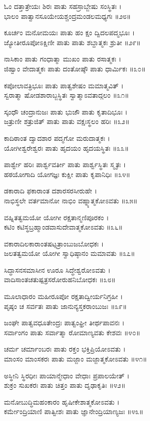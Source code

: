 ಓಂ ದತ್ತಾತ್ರೇಯಃ ಶಿರಃ ಪಾತು ಸಹಸ್ರಾಬ್ಜೇಷು ಸಂಸ್ಥಿತಃ ।\\
ಭಾಲಂ ಪಾತ್ವಾನಸೂಯೇಯಶ್ಚಂದ್ರಮಂಡಲಮಧ್ಯಗಃ ॥೨೮॥

ಕೂರ್ಚಂ ಮನೋಮಯಃ ಪಾತು ಹಂ ಕ್ಷಂ ದ್ವಿದಲಪದ್ಮಭೂಃ ।\\
ಜ್ಯೋತೀರೂಪೋಽಕ್ಷಿಣೀ ಪಾತು ಪಾತು ಶಬ್ದಾತ್ಮಕಃ ಶ್ರುತೀ ॥೨೯॥

ನಾಸಿಕಾಂ ಪಾತು ಗಂಧಾತ್ಮಾ ಮುಖಂ ಪಾತು ರಸಾತ್ಮಕಃ ।\\
ಜಿಹ್ವಾಂ ವೇದಾತ್ಮಕಃ ಪಾತು ದಂತೋಷ್ಠೌ ಪಾತು ಧಾರ್ಮಿಕಃ ॥೩೦॥

ಕಪೋಲಾವತ್ರಿಭೂಃ ಪಾತು ಪಾತ್ವಶೇಷಂ ಮಮಾತ್ಮವಿತ್ ।\\
ಸ್ವರಾತ್ಮಾ ಷೋಡಶಾರಾಬ್ಜಸ್ಥಿತಃ ಸ್ವಾತ್ಮಾಽವತಾದ್ಗಲಂ ॥೩೧॥

ಸ್ಕಂಧೌ ಚಂದ್ರಾನುಜಃ ಪಾತು ಭುಜೌ ಪಾತು ಕೃತಾದಿಭೂಃ ।\\
ಜತ್ರುಣೀ ಶತ್ರುಜಿತ್ ಪಾತು ಪಾತು ವಕ್ಷಃಸ್ಥಲಂ ಹರಿಃ ॥೩೨॥

ಕಾದಿಠಾಂತ ದ್ವಾದಶಾರ ಪದ್ಮಗೋ ಮರುದಾತ್ಮಕಃ ।\\
ಯೋಗೀಶ್ವರೇಶ್ವರಃ ಪಾತು ಹೃದಯಂ ಹೃದಯಸ್ಥಿತಃ ॥೩೩॥

ಪಾರ್ಶ್ವೇ ಹರಿಃ ಪಾರ್ಶ್ವವರ್ತೀ ಪಾತು ಪಾರ್ಶ್ವಸ್ಥಿತಃ ಸ್ಮೃತಃ ।\\
ಹಠಯೋಗಾದಿ ಯೋಗಜ್ಞಃ ಕುಕ್ಷೀ ಪಾತು ಕೃಪಾನಿಧಿಃ ॥೩೪॥

ಡಕಾರಾದಿ ಫಕಾರಾಂತ ದಶಾರಸರಸೀರುಹೇ ।\\
ನಾಭಿಸ್ಥಲೇ ವರ್ತಮಾನೋ ನಾಭಿಂ ವಹ್ನ್ಯಾತ್ಮಕೋಽವತು ॥೩೫॥

ವಹ್ನಿತತ್ವಮಯೋ ಯೋಗೀ ರಕ್ಷತಾನ್ಮಣಿಪೂರಕಂ ।\\
ಕಟಿಂ ಕಟಿಸ್ಥಬ್ರಹ್ಮಾಂಡವಾಸುದೇವಾತ್ಮಕೋಽವತು ॥೩೬॥

ವಕಾರಾದಿಲಕಾರಾಂತಷಟ್ಪತ್ರಾಂಬುಜಬೋಧಕಃ ।\\
ಜಲತತ್ವಮಯೋ ಯೋಗೀ ಸ್ವಾಧಿಷ್ಠಾನಂ ಮಮಾವತು ॥೩೭॥

ಸಿದ್ಧಾಸನಸಮಾಸೀನ ಊರೂ ಸಿದ್ಧೇಶ್ವರೋಽವತು ।\\
ವಾದಿಸಾಂತಚತುಷ್ಪತ್ರಸರೋರುಹನಿಬೋಧಕಃ ॥೩೮॥

ಮೂಲಾಧಾರಂ ಮಹೀರೂಪೋ ರಕ್ಷತಾದ್ವೀರ್ಯನಿಗ್ರಹೀ ।\\
ಪೃಷ್ಠಂ ಚ ಸರ್ವತಃ ಪಾತು ಜಾನುನ್ಯಸ್ತಕರಾಂಬುಜಃ ॥೩೯॥

ಜಂಘೇ ಪಾತ್ವವಧೂತೇಂದ್ರಃ ಪಾತ್ವಂಘ್ರೀ ತೀರ್ಥಪಾವನಃ ।\\
ಸರ್ವಾಂಗಂ ಪಾತು ಸರ್ವಾತ್ಮಾ ರೋಮಾಣ್ಯವತು ಕೇಶವಃ ॥೪೦॥

ಚರ್ಮ ಚರ್ಮಾಂಬರಃ ಪಾತು ರಕ್ತಂ ಭಕ್ತಿಪ್ರಿಯೋಽವತು ।\\
ಮಾಂಸಂ ಮಾಂಸಕರಃ ಪಾತು ಮಜ್ಜಾಂ ಮಜ್ಜಾತ್ಮಕೋಽವತು ॥೪೧॥

ಅಸ್ಥೀನಿ ಸ್ಥಿರಧೀಃ ಪಾಯಾನ್ಮೇಧಾಂ ವೇಧಾಃ ಪ್ರಪಾಲಯೇತ್ ।\\
ಶುಕ್ರಂ ಸುಖಕರಃ ಪಾತು ಚಿತ್ತಂ ಪಾತು ದೃಢಾಕೃತಿಃ ॥೪೨॥

ಮನೋಬುದ್ಧಿಮಹಂಕಾರಂ ಹೃಷೀಕೇಶಾತ್ಮಕೋಽವತು ।\\
ಕರ್ಮೇಂದ್ರಿಯಾಣಿ ಪಾತ್ವೀಶಃ ಪಾತು ಜ್ಞಾನೇಂದ್ರಿಯಾಣ್ಯಜಃ ॥೪೩॥

